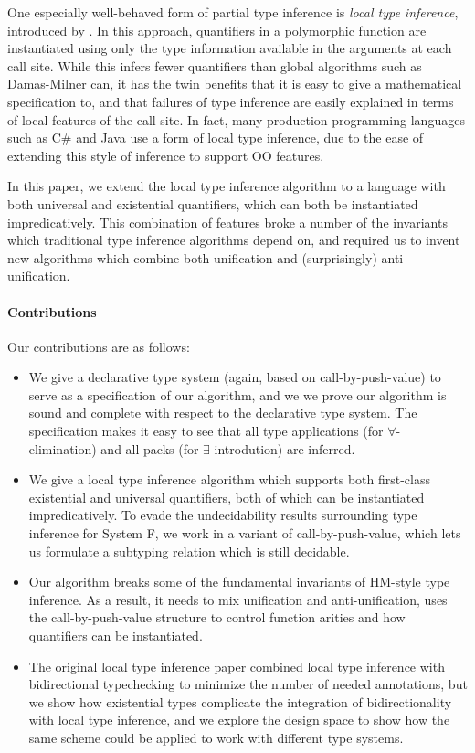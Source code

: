 One especially well-behaved form of partial type inference is \emph{local type inference}, introduced by \citet{pierce-local-2000}. In this approach, quantifiers in a polymorphic function are instantiated using only the type information available in the arguments at each call site. While this infers fewer quantifiers than global algorithms such as Damas-Milner can, it has the twin benefits that it is easy to give a mathematical specification to, and that failures of type inference are easily explained in terms of local features of the call site. In fact, many production programming languages such as C\# and Java use a form of local type inference, due to the ease of extending this style of inference to support OO features. 

In this paper, we extend the local type inference algorithm to a language with both universal and existential quantifiers, which can both be instantiated impredicatively. This combination of features broke a number of the invariants which traditional type inference algorithms depend on, and required us to invent new algorithms which combine both unification and (surprisingly) anti-unification. 


\paragraph{Contributions} Our contributions are as follows: 
\begin{itemize}
\item We give a declarative type system (again, based on call-by-push-value) to serve as a specification of our algorithm, and we we prove our algorithm is sound and complete with respect to the declarative type system. The specification makes it easy to see that all type applications (for $\forall$-elimination) and all packs (for $\exists$-introdution) are inferred. 

\item We give a local type inference algorithm which supports both first-class existential and universal quantifiers, both of which can be instantiated impredicatively. To evade the undecidability results surrounding type inference for System F, we work in a variant of call-by-push-value, which lets us formulate a subtyping relation which is still decidable. 


\item Our algorithm breaks some of the fundamental invariants of
  HM-style type inference. As a result, it needs to mix unification
  and anti-unification, uses the call-by-push-value structure to
  control function arities and how quantifiers can be instantiated. 

\item The original local type inference paper combined local type inference
  with bidirectional typechecking to minimize the number of needed
  annotations, but we show how existential types complicate the integration
  of bidirectionality with local type inference, and we explore the design space
  to show how the same scheme could be applied to work with different
  type systems. 
\end{itemize}





